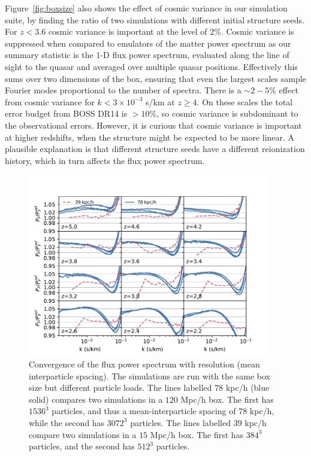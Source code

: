 \documentclass[a4paper,11pt]{article}
\begin{document}
Figure~\ref{fig:boxsize} also shows the effect of cosmic variance in our simulation suite, by finding the ratio of two simulations with different initial structure seeds. For $z < 3.6$ cosmic variance is important at the level of $2\%$. Cosmic variance is suppressed when compared to emulators of the matter power spectrum as our summary statistic is the $1$-D flux power spectrum, evaluated along the line of sight to the quasar and averaged over multiple quasar positions. Effectively this sums over two dimensions of the box, ensuring that even the largest scales sample Fourier modes proportional to the number of spectra. There is a $\sim 2-5\%$ effect from cosmic variance for $k < 3 \times 10^{-3}$ s/km at $z \geq 4$. On these scales the total error budget from BOSS DR14 is $> 10\%$, so cosmic variance is subdominant to the observational errors. However, it is curious that cosmic variance is important at higher redshifts, when the structure might be expected to be more linear. A plausible explanation is that different structure seeds have a different reionization history, which in turn affects the flux power spectrum.

\begin{figure}
\includegraphics[width=0.95\textwidth,trim={0 0 1cm 0},clip]{figures/resolution-convergence.pdf}
 \caption{Convergence of the flux power spectrum with resolution (mean interparticle spacing). The simulations are run with the same box size but different particle loads. The lines labelled $78$ kpc/h (blue solid) compares two simulations in a $120$ Mpc/h box. The first has $1536^3$ particles, and thus a mean-interparticle spacing of $78$ kpc/h, while the second has $3072^3$ particles. The lines labelled $39$ kpc/h compare two simulations in a $15$ Mpc/h box. The first has $384^3$ particles, and the second has $512^3$ particles.}
 \label{fig:resolution}
\end{figure}
\end{document}
